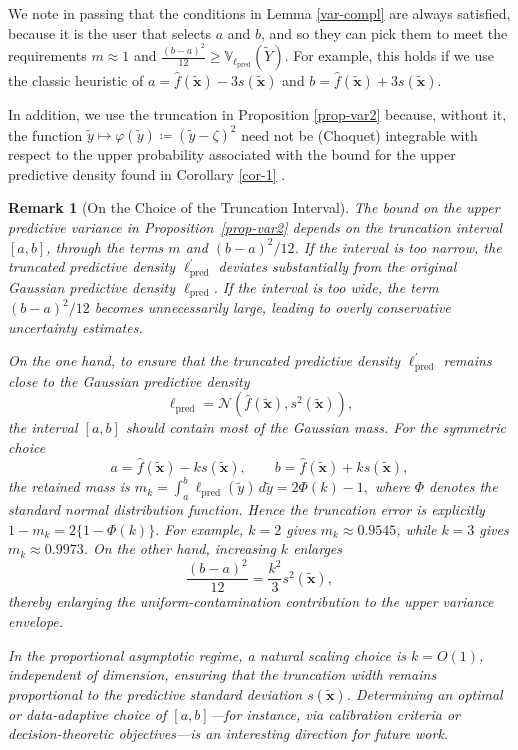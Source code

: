 \documentclass[12pt, english, oneside, a4paper]{article}
\newtheorem{remark}{Remark}
\begin{document}
We note in passing that the conditions in Lemma \ref{var-compl} are always satisfied, because it is the user that selects $a$ and $b$, and so they can pick them to meet the requirements $m \approx 1$ and $\frac{(b-a)^2}{12} \geq \mathbb{V}_{{\ell}_\text{pred}}(\tilde{Y})$. For example, this holds if we use the classic heuristic of $a=\hat{f}(\tilde{\mathbf{x}}) - 3 s(\tilde{\mathbf{x}})$ and $b=\hat{f}(\tilde{\mathbf{x}}) + 3 s(\tilde{\mathbf{x}})$.

In addition, we use the truncation in Proposition \ref{prop-var2} because, without it, the function $\tilde{y} \mapsto \varphi(\tilde{y})\coloneqq(\tilde{y}-\zeta)^2$ need not be (Choquet) integrable with respect to the upper probability associated with the bound for the upper predictive density found in Corollary \ref{cor-1} \citep[Appendix C]{decooman}.

\begin{remark}[On the Choice of the Truncation Interval]
\label{rem:truncation-choice}
The bound on the upper predictive variance in Proposition~\ref{prop-var2}
depends on the truncation interval \([a,b]\), through the terms \(m\) and
\((b-a)^2/12\). If the interval is too narrow, the truncated predictive
density \(\ell^\prime_{\mathrm{pred}}\) deviates substantially from the
original Gaussian predictive density \(\ell_{\mathrm{pred}}\). If the
interval is too wide, the term \((b-a)^2/12\) becomes unnecessarily large,
leading to overly conservative uncertainty estimates.

On the one hand, to ensure that the truncated predictive density
\(\ell^\prime_{\mathrm{pred}}\) remains close to the Gaussian predictive
density
\[
\ell_{\mathrm{pred}}
=
\mathcal{N}\!\left(\hat f(\tilde{\mathbf{x}}),s^2(\tilde{\mathbf{x}})\right),
\]
the interval \([a,b]\) should contain most of the Gaussian mass. For the
symmetric choice
\[
a = \hat f(\tilde{\mathbf{x}}) - k s(\tilde{\mathbf{x}}),
\qquad
b = \hat f(\tilde{\mathbf{x}}) + k s(\tilde{\mathbf{x}}),
\]
the retained mass is
\(
m_k
=
\int_a^b \ell_{\mathrm{pred}}(\tilde y)\,d\tilde y
=
2\Phi(k)-1,
\)
where \(\Phi\) denotes the standard normal distribution function. Hence the
truncation error is explicitly
\(
1-m_k = 2\{1-\Phi(k)\}.
\)
For example, \(k=2\) gives \(m_k \approx 0.9545\), while \(k=3\) gives
\(m_k \approx 0.9973\). On the other hand, increasing \(k\) enlarges
\[
\frac{(b-a)^2}{12}
=
\frac{k^2}{3}s^2(\tilde{\mathbf{x}}),
\]
thereby enlarging the uniform-contamination contribution to the upper
variance envelope.

In the proportional asymptotic regime, a natural scaling choice is
\(k=O(1)\), independent of dimension, ensuring that the truncation width
remains proportional to the predictive standard deviation
\(s(\tilde{\mathbf{x}})\). Determining an optimal or data-adaptive choice
of \([a,b]\)---for instance, via calibration criteria or
decision-theoretic objectives---is an interesting direction for future work.
\end{remark}
\end{document}
